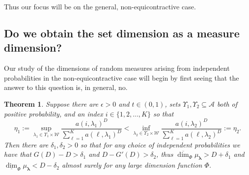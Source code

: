 \documentclass{amsart}
\newtheorem{theorem}{Theorem}
\theoremstyle{plain}
\numberwithin{equation}{section}
\newcommand{\cA}{{\mathcal A}}
\newcommand{\cW}{{\mathcal W}}
\newcommand{\blambda}{{\boldsymbol{\lambda}}}
\newcommand{\odim}{\overline{\dim}}
\newcommand{\udim}{\underline{\dim}}
\begin{document}
Thus our focus will be on the general, non-equicontractive case.

\subsection{Do we obtain the set dimension as a measure dimension?}

Our study of the dimensions of random measures arising from independent
probabilities in the non-equicontractive case will begin by first seeing
that the answer to this question is, in general, no.



\begin{theorem}
\label{thm:general_gap_condition} 
Suppose there are $\epsilon >0$ and $t\in (0,1)$, sets $\Upsilon_{1}, \Upsilon_2 \subseteq \cA$ 
both of positive probability, and an index $i\in\{1,2,\ldots ,K\}$ so that 
\begin{equation*}
     \eta_1 := \sup_{\lambda_1 \in \Upsilon_1 \times \cW} \frac{a(i,\lambda_{1})^{D}}{\sum_{\ell =1}^Ka(\ell ,\lambda_{1})^{D}} <
                 \inf_{\lambda_2 \in \Upsilon_2 \times \cW} \frac{a(i,\lambda_{2})^{D}}{\sum_{\ell=1}^Ka(\ell ,\lambda_{2})^{D}} := \eta_2.
\end{equation*}
Then there are $\delta_1, \delta_2 >0$ so that for any choice of independent probabilities we have that 
$G(D)-D>\delta_1$ and $D - G'(D) > \delta_2$,
thus $\odim_{\Phi}\mu_\blambda>D+\delta_1$ and $\udim_\Phi \mu_\blambda < D - \delta_2$ almost surely for any large dimension function $\Phi$.
\end{theorem}
\end{document}
